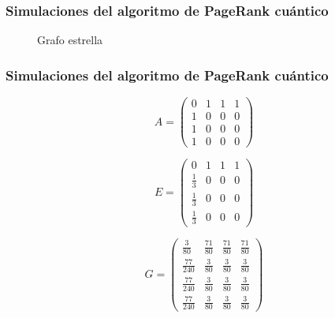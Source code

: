 \documentclass[xetex,mathserif,serif, 8pt]{beamer}
\begin{document}
\begin{frame}
    \frametitle{Simulaciones del algoritmo de PageRank cuántico}


\begin{figure}[H]
    \centering
    \caption[Grafo estrella]{Grafo estrella}
    \label{fig:star}
\end{figure}

\end{frame}

\begin{frame}
    \frametitle{Simulaciones del algoritmo de PageRank cuántico}

\begin{equation}
    A =
    \begin{pmatrix}
        0 & 1 & 1 & 1 \\
        1 & 0 & 0 & 0 \\
        1 & 0 & 0 & 0 \\
        1 & 0 & 0 & 0
    \end{pmatrix}
\end{equation}

\begin{equation}
    E = 
    \begin{pmatrix}
        0 & 1 & 1 & 1 \\
        \frac{1}{3} & 0 & 0 & 0 \\
        \frac{1}{3} & 0 & 0 & 0 \\
        \frac{1}{3} & 0 & 0 & 0
    \end{pmatrix}
\end{equation}

\begin{equation}
    G =
    \begin{pmatrix}
        \frac{3}{80} & \frac{71}{80} & \frac{71}{80} & \frac{71}{80} \\
        \frac{77}{240} & \frac{3}{80} & \frac{3}{80} & \frac{3}{80} \\
        \frac{77}{240} & \frac{3}{80} & \frac{3}{80} & \frac{3}{80} \\
        \frac{77}{240} & \frac{3}{80} & \frac{3}{80} & \frac{3}{80}
    \end{pmatrix}
\end{equation}

\end{frame}
\end{document}
